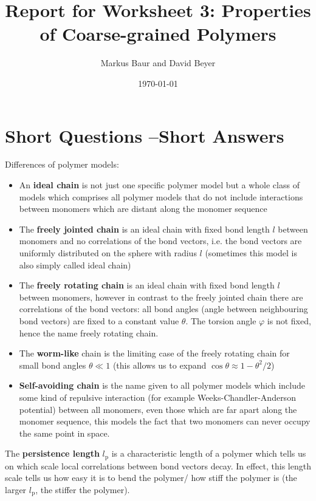 \documentclass[a4paper,10pt,bibtotoc]{scrartcl}
\begin{document}
\titlehead{Simulation Methods in Physics II \hfill SS 2020}
\title{Report for Worksheet 3: Properties of Coarse-grained Polymers}
\author{Markus Baur and David Beyer}
\date{\today}
\maketitle

\tableofcontents

\section{Short Questions --Short Answers}
Differences of polymer models:
\begin{itemize}
\item An \textbf{ideal chain} is not just one specific polymer model but a whole class of models which comprises all polymer models that do not include interactions between monomers which are distant along the monomer sequence
\item The \textbf{freely jointed chain} is an ideal chain with fixed bond length $l$ between monomers and no correlations of the bond vectors, i.e. the bond vectors are uniformly distributed on the sphere with radius $l$ (sometimes this model is also simply called ideal chain)
\item The \textbf{freely rotating chain} is an ideal chain with fixed bond length $l$ between monomers, however in contrast to the freely jointed chain there are correlations of the bond vectors: all bond angles (angle between neighbouring bond vectors) are fixed to a constant value $\theta$. The torsion angle $\varphi$ is not fixed, hence the name freely rotating chain. 
\item The \textbf{worm-like} chain is the limiting case of the freely rotating chain for small bond angles $\theta \ll 1$ (this allows us to expand $\cos \theta \approx 1 - \theta^2/2$)
\item \textbf{Self-avoiding chain} is the name given to all polymer models which include some kind of repulsive interaction (for example Weeks-Chandler-Anderson potential) between all monomers, even those which are far apart along the monomer sequence, this models the fact that two monomers can never occupy the same point in space.
\end{itemize}
The \textbf{persistence length} $l_\text{p}$ is a characteristic length of a polymer which tells us on which scale local correlations between bond vectors decay. In effect, this length scale tells us how easy it is to bend the polymer/ how stiff the polymer is (the larger $l_\text{p}$, the stiffer the polymer).
\text{ }\\
\end{document}
